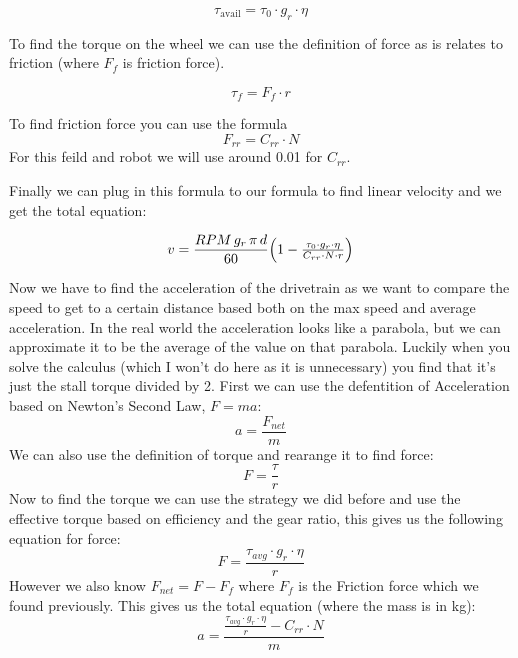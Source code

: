 \documentclass[11pt]{article}
\begin{document}
\[
  \tau_{\mathrm{avail}} = \tau_{0} \cdot g_r \cdot \eta
\]

To find the torque on the wheel we can use the definition of force as is relates to friction (where \(F_{f}\) is friction force).

\[
  \tau_{f} = F_{f} \cdot r
\]

To find friction force you can use the formula
\[
  F_{rr} = C_{rr} \cdot N
\]
For this feild and robot we will use around 0.01 for \(C_{rr}\).

Finally we can plug in this formula to our formula to find linear velocity and we get the total equation:

\[
  v = \frac{RPM\,g_r\,\pi\,d}{60}\Bigl(1 - \tfrac{\tau_{0} \cdot g_r \cdot \eta}{C_{rr} \cdot N \cdot r}\Bigr)
\]

Now we have to find the acceleration of the drivetrain as we want to compare the speed to get to a certain distance based both on the max speed and average acceleration. In the real world the acceleration looks like a parabola, but we can approximate it to be the average of the value on that parabola. Luckily when you solve the calculus (which I won't do here as it is unnecessary) you find that it's just the stall torque divided by 2. First we can use the defentition of Acceleration based on Newton's Second Law, \(F = ma\):
\[
  a = \frac{F_{net}}{m}
\]
We can also use the definition of torque and rearange it to find force:
\[
  F = \frac{\tau}{r}
\]
Now to find the torque we can use the strategy we did before and use the effective torque based on efficiency and the gear ratio, this gives us the following equation for force:
\[
  F = \frac{\tau_{avg} \cdot g_r \cdot \eta}{r}
\]
However we also know \(F_{net} = F - F_f\) where \(F_f\) is the Friction force which we found previously. This gives us the total equation (where the mass is in kg):
\[
  a = \frac{\frac{\tau_{avg} \cdot g_r \cdot \eta}{r} - C_{rr} \cdot N}{m}
\]
\end{document}
